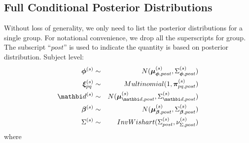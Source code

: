 \documentclass[12pt,titlepage,fleqn]{article}
\newcommand{\1}{{\bm 1}}
\newcommand{\vd}{\mathbi d}
\newcommand{\vbeta}{\boldsymbol \beta}
\newcommand{\vphi}{\boldsymbol \phi}
\newcommand{\vxi}{\boldsymbol \xi}
\newcommand{\vmu}{\boldsymbol{\mu}}
\newcommand{\vpi}{\boldsymbol{\pi}}
\newcommand{\s}{^{(s)}}
\begin{document}
\subsection*{Full Conditional Posterior Distributions}
Without loss of {\color{blue}generality}, we only need to list the posterior distributions for a single group. For notational convenience, we drop all the superscripts for group. The subscript ``$post$'' is used to indicate the quantity is based on posterior distribution. 
Subject level:
\begin{eqnarray}
\label{post-phi}
\vphi\s &\sim& N(\vmu_{\vphi,post}\s, \Sigma_{\vphi,post}\s)\\
\label{post-xi}
\vxi_{pq}\s &\sim& Multi{\color{blue}nomial}(1, \vpi_{pq, post}\s)\\
\label{post-d}
\vd\s &\sim& N(\vmu_{\vd,post}\s, \Sigma_{\vd,post}\s)\\
\label{post-beta}
\vbeta\s &\sim& N(\vmu_{\vbeta,post}\s, \Sigma_{\vbeta,post}\s)\\
\label{post-omega}
\Sigma\s &\sim& InvWishart(\Sigma_{post}\s, \nu_{\Sigma,post}\s) 
\end{eqnarray}
where   
\end{document}
